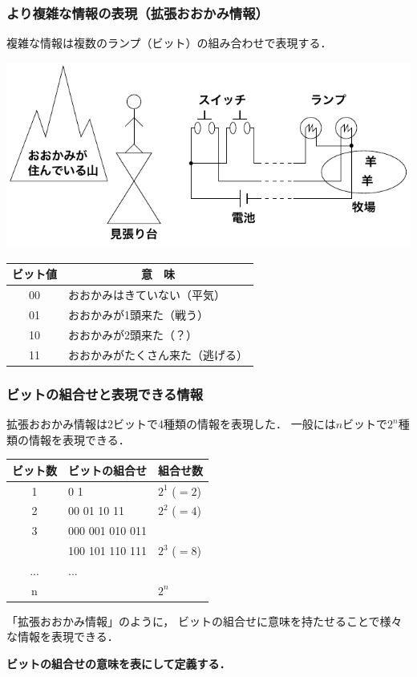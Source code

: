 \documentclass{beamer}                 %
\begin{document}
\begin{frame}
  \frametitle{より複雑な情報の表現（拡張おおかみ情報）}
  複雑な情報は複数のランプ（ビット）の組み合わせで表現する．
  \begin{center}
    \includegraphics[scale=0.8]{../Tikz/ookami2.pdf}
    {\small\begin{tabular}{c|l} \hline\hline
      ビット値 & \multicolumn{1}{c}{意　味}  \\
      \hline
      00 & おおかみはきていない（平気）      \\
      01 & おおかみが1頭来た（戦う）         \\
      10 & おおかみが2頭来た（？）           \\
      11 & おおかみがたくさん来た（逃げる）  \\
    \end{tabular}}
  \end{center}
\end{frame}

\begin{frame}
  \frametitle{ビットの組合せと表現できる情報}
  拡張おおかみ情報は2ビットで4種類の情報を表現した．
  一般には$n$ビットで$2^n$種類の情報を表現できる．
  \begin{center}
    {\small\begin{tabular}{c|l|l} \hline\hline
      ビット数 & \multicolumn{1}{c|}{ビットの組合せ} & 組合せ数\\
      \hline
      1 & 0 1   & $2^1$ ($=2$) \\
      2 & 00 01 10 11 & $2^2$ ($=4$) \\
      3 & 000 001 010 011 &   \\
      & 100 101 110 111 & $2^3$ ($=8$) \\
      ...& ... &\\
      n &  & $2^n$ \\
    \end{tabular}}
  \end{center}

  「拡張おおかみ情報」のように，
  ビットの組合せに意味を持たせることで様々な情報を表現できる．
  \begin{center}
    {\bf ビットの組合せの意味を表にして定義する．}
  \end{center}
\end{frame}
\end{document}
